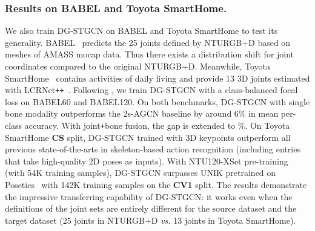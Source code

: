 \vspace{-1mm}
\subsubsection{Results on BABEL and Toyota SmartHome. }
We also train DG-STGCN on BABEL and Toyota SmartHome to test its generality.
BABEL~\cite{punnakkal2021babel} predicts the 25 joints defined by NTURGB+D based on meshes of AMASS mocap data. 
Thus there exists a distribution shift for joint coordinates compared to the original NTURGB+D. 
Meanwhile, Toyota SmartHome~\cite{Das_2019_ICCV} contains activities of daily living and provide 13 3D joints estimated with LCRNet\texttt{++}~\cite{rogez2019lcr}. 
Following \cite{punnakkal2021babel}, we train DG-STGCN with a class-balanced focal loss on BABEL60 and BABEL120. 
On both benchmarks, DG-STGCN with single bone modality outperforms the 2s-AGCN baseline by around 6\% in mean per-class accuracy. 
With joint\texttt{+}bone fusion, the gap is extended to \%.
On Toyota SmartHome \textbf{CS} split, DG-STGCN trained with 3D keypoints outperform all previous state-of-the-arts 
in skeleton-based action recognition (including entries that take high-quality 2D poses as inputs).
With NTU120-XSet pre-training (with 54K training samples), 
DG-STGCN surpasses UNIK pretrained on Posetics~\cite{yang2021unikau} with 142K training samples on the \textbf{CV1} split. 
The results demonstrate the impressive transferring capability of DG-STGCN:
it works even when the definitions of the joint sets are entirely different for the source dataset and the target dataset 
(25 joints in NTURGB+D \emph{vs.} 13 joints in Toyota SmartHome). 
